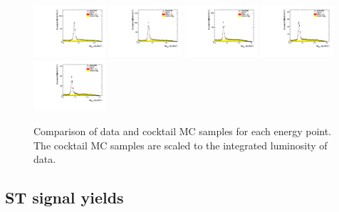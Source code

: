 \begin{figure}[h]
    \includegraphics[width=0.24\textwidth]{figure/full_mbc/output_4750_mBC.pdf}
    \includegraphics[width=0.24\textwidth]{figure/full_mbc/output_4780_mBC.pdf}
    \includegraphics[width=0.24\textwidth]{figure/full_mbc/output_4840_mBC.pdf}
    \includegraphics[width=0.24\textwidth]{figure/full_mbc/output_4914_mBC.pdf}
    \includegraphics[width=0.24\textwidth]{figure/full_mbc/output_4946_mBC.pdf}
    \caption{Comparison of data and cocktail MC samples for each energy point. The cocktail MC samples are scaled to the integrated luminosity of data.}
\label{fig:full_mbc}
\end{figure}

\subsection{ST signal yields}
\label{sec:st_yields}

